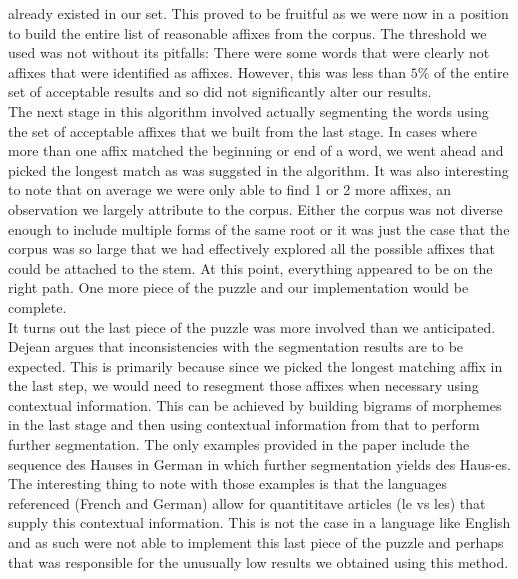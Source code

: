 \documentclass[11pt]{article}
\begin{document}
already existed in our set. This proved to be fruitful as we were
now in a position to build the entire list of reasonable affixes from the 
corpus. The threshold we used was not without its pitfalls: There were some 
words that were clearly not affixes that were identified as affixes. However, 
this was less than $5\%$ of the entire set of acceptable results and so did not
significantly alter our results.\\
The next stage in this algorithm involved actually segmenting the words using
the set of acceptable affixes that we built from the last stage. In cases where
more than one affix matched the beginning or end of a word, we went ahead and 
picked the longest match as was suggsted in the algorithm. It was also
interesting to note that on average we were only able to find 1 or 2 more 
affixes, an observation we largely attribute to the corpus. Either the corpus
was not diverse enough to include multiple forms of the same root or it
was just the case that the corpus was so large that we had effectively explored
all the possible affixes that could be attached to the stem. At this point, 
everything appeared to be on the right path. One more piece of the puzzle and
our implementation would be complete.\\
It turns out the last piece of the puzzle was more involved than
we anticipated. Dejean argues that inconsistencies with the segmentation 
results are to be expected. This is primarily because since we picked the 
longest matching affix in the last step, we would need to resegment those 
affixes when necessary using contextual information. This can be achieved by
building bigrams of morphemes in the last stage and then using contextual
information from that to perform further segmentation. The only examples
provided in the paper include the sequence des Hauses in German in which 
further segmentation yields des Haus-es. The interesting thing to note with
those examples is that the languages referenced (French and German) allow
for quantititave articles (le vs les) that supply this contextual information.
This is not the case in a language like English and as such were not able to
implement this last piece of the puzzle and perhaps that was responsible for
the unusually low results we obtained using this method.
\end{document}
